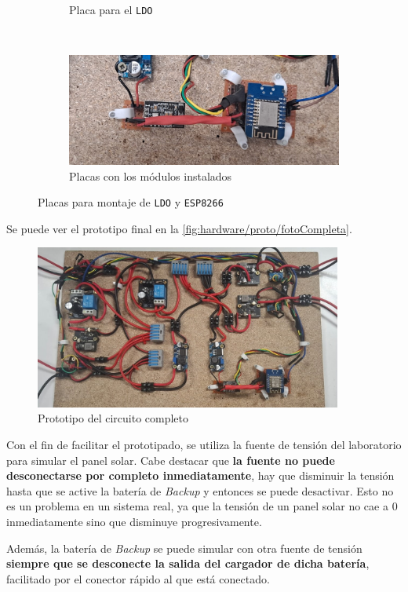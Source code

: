 \begin{figure}[H]
\begin{subfigure}[b]{0.35\textwidth}
        \caption{Placa para el \texttt{LDO}}
    \end{subfigure}
    \\[0.5cm]
    \begin{subfigure}[b]{0.8\textwidth}
        \includegraphics[width=\textwidth]{images/2-hardware/baquelitasConectadas.png}
        \caption{Placas con los módulos instalados}
    \end{subfigure}

    \caption{Placas para montaje de \texttt{LDO} y \texttt{ESP8266}}
    \label{fig:hardware/proto/baquelitas}
\end{figure}

Se puede ver el prototipo final en la \autoref{fig:hardware/proto/fotoCompleta}.

\begin{figure}[H]
    \centering
    \includegraphics[width=0.9\textwidth]{images/2-hardware/circuitoFoto.png}
    \caption{Prototipo del circuito completo}
    \label{fig:hardware/proto/fotoCompleta}
\end{figure}

Con el fin de facilitar el prototipado, se utiliza la fuente de tensión del laboratorio para simular el panel solar. Cabe destacar que \textbf{la fuente no puede desconectarse por completo inmediatamente}, hay que disminuir la tensión hasta que se active la batería de \textit{Backup} y entonces se puede desactivar. Esto no es un problema en un sistema real, ya que la tensión de un panel solar no cae a $0$ inmediatamente sino que disminuye progresivamente.

Además, la batería de \textit{Backup} se puede simular con otra fuente de tensión \textbf{siempre que se desconecte la salida del cargador de dicha batería}, facilitado por el conector rápido al que está conectado.